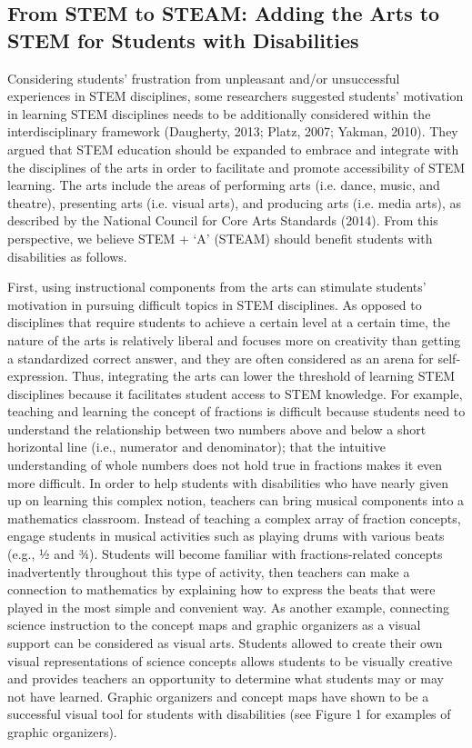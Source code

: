 \documentclass[11.5pt]{sig-alternate} %
\begin{document}
\begin{large}
\subsection*{From STEM to STEAM:  Adding the Arts to STEM for Students with Disabilities}

Considering students’ frustration from unpleasant and/or unsuccessful experiences in STEM disciplines, some researchers suggested students’ motivation in learning STEM disciplines needs to be additionally considered within the interdisciplinary framework (Daugherty, 2013; Platz, 2007; Yakman, 2010). They argued that STEM education should be expanded to embrace and integrate with the disciplines of the arts in order to facilitate and promote accessibility of STEM learning. The arts include the areas of performing arts (i.e. dance, music, and theatre), presenting arts (i.e. visual arts), and producing arts (i.e. media arts), as described by the National Council for Core Arts Standards (2014). From this perspective, we believe STEM + ‘A’ (STEAM) should benefit students with disabilities as follows.
	
First, using instructional components from the arts can stimulate students’ motivation in pursuing difficult topics in STEM disciplines. As opposed to disciplines that require students to achieve a certain level at a certain time, the nature of the arts is relatively liberal and focuses more on creativity than getting a standardized correct answer, and they are often considered as an arena for self-expression. Thus, integrating the arts can lower the threshold of learning STEM disciplines because it facilitates student access to STEM knowledge. For example, teaching and learning the concept of fractions is difficult because students need to understand the relationship between two numbers above and below a short horizontal line (i.e., numerator and denominator); that the intuitive understanding of whole numbers does not hold true in fractions makes it even more difficult. In order to help students with disabilities who have nearly given up on learning this complex notion, teachers can bring musical components into a mathematics classroom. Instead of teaching a complex array of fraction concepts, engage students in musical activities such as playing drums with various beats (e.g., ½ and ¾). Students will become familiar with fractions-related concepts inadvertently throughout this type of activity, then teachers can make a connection to mathematics by explaining how to express the beats that were played in the most simple and convenient way.  As another example, connecting science instruction to the concept maps and graphic organizers as a visual support can be considered as visual arts.  Students allowed to create their own visual representations of science concepts allows students to be visually creative and provides teachers an opportunity to determine what students may or may not have learned.  Graphic organizers and concept maps have shown to be a successful visual tool for students with disabilities (see Figure 1 for examples of graphic organizers). 


\end{large}
\end{document}
